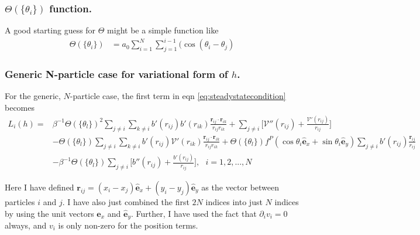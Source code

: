 \documentclass{article}
\begin{document}
\subsubsection{$\Theta(\{\theta_i\})$ function.}

A good starting guess for $\Theta$ might be a simple function like
\begin{align}
  \Theta(\{\theta_i\})&=a_0\sum_{i=1}^N\sum_{j=1}^{i-1}(\cos(\theta_i-\theta_j)
\end{align}

\subsubsection{Generic N-particle case for variational form of $h$.}
For the generic, $N$-particle case, the first term in eqn \ref{eq:steadystatecondition} becomes
\begin{align}\label{eq:genericNpartD_t}
  L_i(h) =& \beta^{-1}\Theta(\{\theta_l\})^2\sum_{j\neq i}
            \sum_{k\neq i} b'(r_{ij})b'(r_{ik})
            \frac{\bm{r}_{ij}\cdot\bm{r}_{ik}}{r_{ij}r_{ik}}
            + \sum_{j\neq i}\bigg[\mathcal{V}''(r_{ij})
            +\frac{\mathcal{V}'(r_{ij})}{r_{ij}}\bigg]\nonumber\\
          & - \Theta(\{\theta_l\})\sum_{j\neq i}\sum_{k\neq i}
            b'(r_{ij})\mathcal{V}'(r_{ik})
            \frac{\bm{r}_{ij}\cdot\bm{r}_{ik}}{r_{ij}r_{ik}}
            +\Theta(\{\theta_l\})f^P(\cos\theta_i\hat{\bm{e}}_x+\sin\theta_i\hat{\bm{e}}_y)
            \sum_{j\neq i}b'(r_{ij})
            \frac{\bm{r}_{ij}}{r_{ij}}\nonumber\\
          & - \beta^{-1}\Theta(\{\theta_l\})\sum_{j\neq i}\bigg[b''(r_{ij})
            +\frac{b'(r_{ij})}{r_{ij}}\bigg],\:\:\: i = 1,2,...,N
\end{align}

Here I have defined $\bm{r}_{ij}=(x_i-x_j)\hat{\bm{e}}_x+(y_i-y_j)\hat{\bm{e}}_y$ as the vector
between particles $i$ and $j$. I have also just combined the first $2N$ indices into just $N$
indices by using the unit vectors $\hat{\bm{e}}_x$ and $\hat{\bm{e}}_y$. Further, I have used the
fact that $\partial_i v_i=0$ always, and $v_i$ is only non-zero for the position terms.
\end{document}
